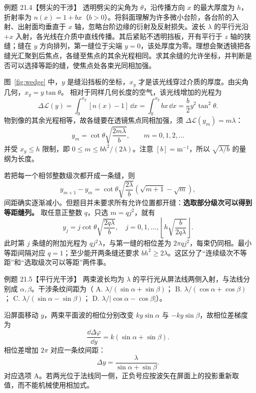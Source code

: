 \begin{origexamplebox}{例题 21.4【劈尖的干涉】}
透明劈尖的尖角为 $\theta$，沿传播方向 $x$ 的最大厚度为 $h$，折射率为 $n(x)=1+bx$（$b>0$）。将斜面理解为许多微小台阶，各台阶的入射、出射面均垂直于 $x$ 轴，忽略台阶边缘的衍射及反射损失。波长 $\lambda$ 的平行光沿 $+x$ 入射，各光线在介质中直线传播。其后紧贴不透明挡板，开有平行于 $z$ 轴的狭缝；缝在 $y$ 方向排列，第一缝位于尖端 $y=0$，该处厚度为零。理想会聚透镜把各缝光汇聚到后焦点，各缝至焦点的其余光程相同。求其余缝的允许坐标，并判断是否可以选择等距的缝，使焦点处各束光同相加强。
\end{origexamplebox}
\begin{xesolution}
图~\ref{fig:wedge} 中，$y$ 是缝沿挡板的坐标，$x_y$ 才是该光线穿过介质的厚度。由尖角几何，$x_y=y\tan\theta$。
\WedgeInterferenceDiagram
相对于同样几何长度的空气，该光线增加的光程为
\[
 \Delta\mathcal L(y)=\int_0^{x_y}[n(x)-1]\,\dd x
 =\int_0^{x_y}bx\,\dd x=\frac b2y^2\tan^2\theta.
\]
物到像的其余光程相等，故各缝要在透镜焦点同相加强，须 $\Delta\mathcal L(y_m)=m\lambda$：
\[
 \boxed{y_m=\cot\theta\sqrt{\frac{2m\lambda}{b}},\qquad m=0,1,2,\ldots}
\]
并受 $x_y\le h$ 限制，即 $0\le m\le bh^2/(2\lambda)$。注意 $[b]=\mathrm m^{-1}$，所以 $\sqrt{\lambda/b}$ 的量纲为长度。

若把每一个相邻整数级次都开成一条缝，则
\[
 y_{m+1}-y_m=\cot\theta\sqrt{\frac{2\lambda}{b}}
 (\sqrt{m+1}-\sqrt m),
\]
间距确实逐渐减小。但题目并未要求所有允许位置都开缝：\textbf{选取部分级次可以得到等距缝列。}
取任意正整数 $q$，只选 $m=qj^2$，就有
\[
 \boxed{y_j=j\cot\theta\sqrt{\frac{2q\lambda}{b}},\quad
 j=0,1,\ldots,\left\lfloor h\sqrt{\frac{b}{2q\lambda}}\right\rfloor.}
\]
此时第 $j$ 条缝的附加光程为 $qj^2\lambda$，与第一缝的相位差为 $2\pi qj^2$，每束仍同相。最小等距间隔对应 $q=1$；至少能开两条缝还要求 $bh^2\ge2\lambda$。这区分了“连续级次不等距”和“选取级次可以等距”两件事。
\end{xesolution}

\PlaneWaveDiagram

\begin{origexamplebox}{例题 21.5【平行光干涉】}
两束波长均为 $\lambda$ 的平行光从屏法线两侧入射，与法线分别成 $\alpha,\beta$。干涉条纹间距为（
A. $\lambda/(\sin\alpha+\sin\beta)$；
B. $\lambda/(\cos\alpha+\cos\beta)$；
C. $\lambda/(\sin\alpha-\sin\beta)$；
D. $\lambda/|\cos\alpha-\cos\beta|$）。
\end{origexamplebox}
\begin{xesolution}
沿屏面移动 $y$，两束平面波的相位分别改变 $k y\sin\alpha$ 与 $-k y\sin\beta$，故相位差梯度为
\[
 \frac{\dd\Delta\varphi}{\dd y}=k(\sin\alpha+\sin\beta).
\]
相位差增加 $2\pi$ 对应一条纹间距：
\[
 \boxed{\Delta y=\frac{\lambda}{\sin\alpha+\sin\beta}}.
\]
对应选项 A。若两光位于法线同一侧，正负号应按波矢在屏面上的投影重新取值，而不能机械使用相加式。
\end{xesolution}

